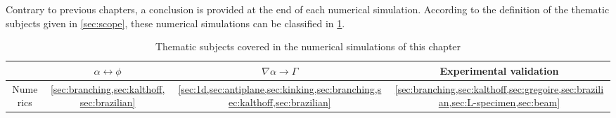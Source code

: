 Contrary to previous chapters, a conclusion is provided at the end of each numerical simulation. According to the definition of the thematic subjects given in \cref{sec:scope}, these numerical simulations can be classified in \cref{tab:summsim}.
\begin{table}[htbp]
\centering
\caption{Thematic subjects covered in the numerical simulations of this chapter} \label{tab:summsim}
\begin{tabular}{cccc} \toprule
& $\alpha\leftrightarrow\phi$ & $\nabla\alpha\to\Gamma$ & Experimental validation \\ \midrule
Numerics & \cref{sec:branching,sec:kalthoff,sec:brazilian} & \cref{sec:1d,sec:antiplane,sec:kinking,sec:branching,sec:kalthoff,sec:brazilian} & \cref{sec:branching,sec:kalthoff,sec:gregoire,sec:brazilian,sec:L-specimen,sec:beam} \\ \bottomrule
\end{tabular}
\end{table}

